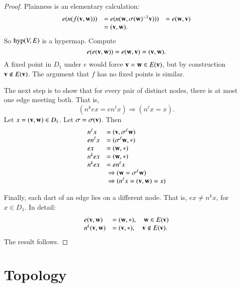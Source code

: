 \begin{proof}  Plainness is an elementary calculation:
\begin{displaymath}
\begin{array}{lll}
e(n(f({\mathbf v},{\mathbf w}))) &= e(n({\mathbf w},\sigma({\mathbf w})^{-1} {\mathbf v}))) &=
e({\mathbf w},{\mathbf v})\\ 
&= ({\mathbf v},{\mathbf w}).
\end{array}
\end{displaymath}
So ${\operatorname{hyp}}(V,E)$ is a hypermap. Compute
\begin{displaymath}e(e({\mathbf v},{\mathbf w})) = e({\mathbf w},{\mathbf v}) = ({\mathbf v},{\mathbf w}).\end{displaymath}
A fixed point in $D_1$ under $e$ would force ${\mathbf v} = {\mathbf w}\in E({\mathbf v})$,
but by construction ${\mathbf v}\not\in E({\mathbf v})$.  The argument that $f$ has no
fixed points is similar.

The next step is to show that for every pair of distinct nodes, there
is at most one edge meeting both.  That is,
\begin{displaymath}(n^k e x = e n^\ell x)\Rightarrow (n^\ell x =
x).\end{displaymath} Let $x = ({\mathbf v},{\mathbf w})\in D_1$.  Let
$\sigma=\sigma({\mathbf v})$. Then
\begin{displaymath}
\begin{array}{lllllll}
n^\ell x &= ({\mathbf v},\sigma^\ell {\mathbf w})\\
e n^\ell x &= (\sigma^\ell {\mathbf w},*)\\
e x &= ({\mathbf w},*)\\
n^k e x &= ({\mathbf w},*)\\
n^k e x &= e n^\ell x \\&\ \Rightarrow ({\mathbf w} = \sigma^\ell {\mathbf w}) \\&\ \Rightarrow
(n^\ell x = ({\mathbf v},{\mathbf w}) = x)
\end{array}
\end{displaymath}

Finally,  each dart of an edge lies on a different node.
That is, $e x \ne n^k x$, for $x\in D_1$.   In detail:
\begin{displaymath}
\begin{array}{lll}
e({\mathbf v},{\mathbf w}) &= ({\mathbf w},*),\quad {\mathbf w}\in E({\mathbf v})\\
n^k({\mathbf v},{\mathbf w}) &= ({\mathbf v},*),\quad {\mathbf v}\not\in E({\mathbf v}).
\end{array}
\end{displaymath}
The result follows.
\end{proof}

\section{Topology}\label{sec:topology}

